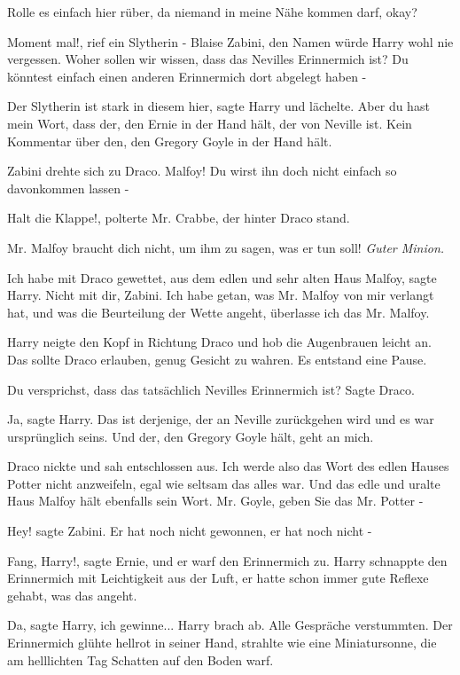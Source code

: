 \glqq Rolle es einfach hier rüber, da niemand in meine Nähe kommen darf,
okay?\grqq{}

\glqq Moment mal!\grqq{}, rief ein Slytherin - Blaise Zabini, den Namen würde
Harry wohl nie vergessen. \glqq Woher sollen wir wissen, dass das Nevilles
Erinnermich ist? Du könntest einfach einen anderen Erinnermich dort abgelegt
haben -\grqq{}

\glqq Der Slytherin ist stark in diesem hier\grqq{}, sagte Harry und lächelte.
\glqq Aber du hast mein Wort, dass der, den Ernie in der Hand hält, der von
Neville ist. Kein Kommentar über den, den Gregory Goyle in der Hand hält.\grqq{}

Zabini drehte sich zu Draco. \glqq Malfoy! Du wirst ihn doch nicht einfach so
davonkommen lassen -\grqq{}

\glqq Halt die Klappe!\grqq{}, polterte Mr. Crabbe, der hinter Draco stand.

\glqq Mr. Malfoy braucht dich nicht, um ihm zu sagen, was er tun soll!\grqq{}
\emph{Guter Minion.}

\glqq Ich habe mit Draco gewettet, aus dem edlen und sehr alten Haus
Malfoy\grqq{}, sagte Harry. \glqq Nicht mit dir, Zabini. Ich habe getan, was Mr.
Malfoy von mir verlangt hat, und was die Beurteilung der Wette angeht, überlasse
ich das Mr. Malfoy.\grqq{}

Harry neigte den Kopf in Richtung Draco und hob die Augenbrauen leicht an. Das
sollte Draco erlauben, genug Gesicht zu wahren. Es entstand eine Pause.

\glqq Du versprichst, dass das tatsächlich Nevilles Erinnermich ist?\grqq{}
Sagte Draco.

\glqq Ja\grqq{}, sagte Harry. \glqq Das ist derjenige, der an Neville
zurückgehen wird und es war ursprünglich seins. Und der, den Gregory Goyle hält,
geht an mich.\grqq{}

Draco nickte und sah entschlossen aus. \glqq Ich werde also das Wort des edlen
Hauses Potter nicht anzweifeln, egal wie seltsam das alles war. Und das edle und
uralte Haus Malfoy hält ebenfalls sein Wort. Mr. Goyle, geben Sie das Mr. Potter
-\grqq{}

\glqq Hey!\grqq{} sagte Zabini. \glqq Er hat noch nicht gewonnen, er hat noch
nicht -\grqq{}

\glqq Fang, Harry!\grqq{}, sagte Ernie, und er warf den Erinnermich zu. Harry
schnappte den Erinnermich mit Leichtigkeit aus der Luft, er hatte schon immer
gute Reflexe gehabt, was das angeht.

\glqq Da\grqq{}, sagte Harry, \glqq ich gewinne...\grqq{} Harry brach ab. Alle
Gespräche verstummten. Der Erinnermich glühte hellrot in seiner Hand, strahlte
wie eine Miniatursonne, die am helllichten Tag Schatten auf den Boden warf.

